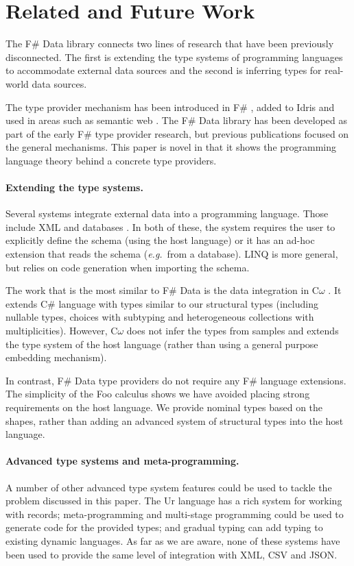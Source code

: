 \documentclass[pldi-cameraready]{sigplanconf-pldi16}
\begin{document}
\section{Related and Future Work}
\label{sec:related}

The F\# Data library connects two lines of research that have been previously disconnected. The first is
extending the type systems of programming languages to accommodate external data sources and the second
is inferring types for real-world data sources.

The type provider mechanism has been introduced in F\# \cite{fsharp-typeprov,fsharp-typeprov-ddfp},
added to Idris  \cite{idris-tp} and used in areas such as semantic web \cite{liteq}. The F\# Data
library has been developed as part of the early F\# type provider research, but previous
publications focused on the general mechanisms. This paper is novel in that it shows the
programming language theory behind a concrete type providers.

\paragraph{Extending the type systems.}
Several systems integrate external data into a programming language. Those include
XML \cite{xduce,xduce-ml} and databases \cite{links}. In both of these, the system requires
the user to explicitly define the schema (using the host language) or it has an ad-hoc extension
that reads the schema (\emph{e.g.}~from a database). LINQ \cite{linq} is more general, but relies
on code generation when importing the schema.

The work that is the most similar to F\# Data is the data integration in C$\omega$ \cite{comega-xs}.
It extends C\# language with types similar to our structural types
(including nullable types, choices with subtyping and heterogeneous collections with multiplicities).
However, C$\omega$ does not infer the types from samples and extends the type system of the host
language (rather than using a general purpose embedding mechanism).

In contrast, F\# Data type providers do not require any F\# language extensions. The simplicity
of the Foo calculus shows we have avoided placing strong requirements on the host language. We
provide nominal types based on the shapes, rather than adding an advanced
system of structural types into the host language.

\paragraph{Advanced type systems and meta-programming.}
A number of other advanced type system features could be used to tackle the problem discussed
in this paper. The Ur \cite{ur} language has a rich system for working with records;
meta-programming \cite{template-hask,th-camlp4} and multi-stage programming \cite{multi-stage}
could be used to generate code for the provided types; and gradual typing \cite{gradual,gradual-js}
can add typing to existing dynamic languages. As far as we are aware, none of these
systems have been used to provide the same level of integration with XML, CSV and JSON.
\end{document}
